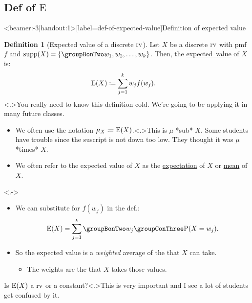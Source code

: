 \documentclass[english,notheorems]{beamer}\usepackage[]{graphicx}\usepackage[]{xcolor}
\makeatletter
\newcommand{\omalertA}{\detokenize{alert@+|+-}}
\newcommand{\omFinalAnswer}[1]{\textcolor<.>{orange} {#1}}
\newcommand{\omemphA}[1]{\emph {#1}}
\newcommand{\answer}[1]{\rule[0.5ex]{1\columnwidth}{1pt}\par\nobreak A: #1}
\providecommand\definitionname{Definition}
\theoremstyle{definition}
\newtheorem{defn}{\protect\definitionname}
\theoremstyle{plain}
\theoremstyle{remark}
\makeatother
\begin{document}
\subsection{Def of $\mathrm{E}$}
\begin{frame}<beamer:-3|handout:1>[label=def-of-expected-value]{Definition of expected value}
\begin{defn}[Expected value of a discrete $\text{rv}$]
Let $X$ be a discrete $\text{rv}$ with pmf $f$ and $\omSupp X=\left\{ \colorBonTwo{w_{1},w_{2},\ldots,w_{k}}\right\} $.
Then, the \uline{expected\ value} of $X$ is:
\begin{align*}
\mathrm{E}(X) & \coloneqq\sum^{k}_{j=1}w_{j}f(w_{j}).
\end{align*}
\note<.>{You really need to know this definition cold. We're going to be applying
it in many future classes.}\smallskip{}


\end{defn}
\begin{overprint}
\begin{itemize}
\item We often use the notation $\mu_{X}\coloneqq\mathrm{E}(X)$.\note<.>{This is $\mu$ {*}sub{*} $X$. Some students have trouble since the
suscript is not down too low. They thought it was $\mu$ {*}times{*}
$X$. }
\item We often refer to the expected value of $X$ as the \uline{expectation}
of $X$ or \uline{mean} of $X$.
\end{itemize}
\begin{alertenv}<.->
\end{alertenv}

\begin{itemize}
\item We can substitute for $f(w_{j})$ in the def.: 
\[
\omE(X)=\sum^{k}_{j=1}\colorBonTwo{w_{j}}\colorConThree{\omPr(X=w_{j})}.
\]
\item So the expected value is a \omemphA{weighted} average\emph{ }of the
 that $X$ can take.
\begin{itemize}
\item The weights are the  that $X$ takes
those values.
\end{itemize}
\end{itemize}
\begin{omx}
Is $\mathrm{E}(X)$ a $\text{rv}$ or a constant?\note<.>{This is very important and I see a lot of students get confused by
it.}
\end{omx}

\end{overprint}
\end{frame}
\end{document}
